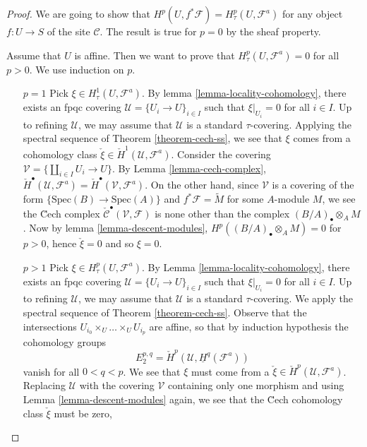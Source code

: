 \begin{proof}
We are going to show that
$H^p(U, f^*\mathcal{F}) = H^p_\tau(U, \mathcal{F}^a)$
for any object $f : U \to S$ of the site $\mathcal{C}$.
The result is true for $p = 0$ by the sheaf property.

\medskip\noindent
Assume that $U$ is affine. Then we want to prove that
$H^p_\tau(U, \mathcal{F}^a) = 0$ for all $p > 0$. We use induction on $p$.
\begin{enumerate}
\item[$p = 1$]
Pick $\xi \in H^1_\tau(U, \mathcal{F}^a)$.
By lemma \ref{lemma-locality-cohomology},
there exists an fpqc covering $\mathcal{U} = \{U_i \to U\}_{i \in I}$
such that $\xi|_{U_i} = 0$ for all $i \in I$. Up to refining
$\mathcal{U}$, we may assume that $\mathcal{U}$ is a standard
$\tau$-covering. Applying the spectral sequence of
Theorem \ref{theorem-cech-ss},
we see that $\xi$ comes from a cohomology class
$\check{\xi} \in \check H^1(\mathcal{U}, \mathcal{F}^a)$.
Consider the covering $\mathcal{V} = \{\coprod_{i\in I} U_i \to U\}$. By
Lemma \ref{lemma-cech-complex},
$\check H^\bullet(\mathcal{U}, \mathcal{F}^a) =
\check H^\bullet(\mathcal{V}, \mathcal{F}^a)$.
On the other hand, since $\mathcal{V}$ is a covering of the form
$\{\text{Spec}(B) \to \text{Spec}(A)\}$ and $f^*\mathcal{F} = \widetilde{M}$
for some $A$-module $M$, we see the \u Cech complex
$\check{\mathcal{C}}^\bullet(\mathcal{V}, \mathcal{F})$
is none other than the complex $(B/A)_\bullet \otimes_A M$.
Now by lemma \ref{lemma-descent-modules},
$H^p((B/A)_\bullet \otimes_A M) = 0$ for $p>0$, hence $\check{\xi} = 0$ and so
$\xi = 0$.
\item[$p > 1$]
Pick $\xi \in H^p_\tau(U, \mathcal{F}^a)$. By
Lemma \ref{lemma-locality-cohomology},
there exists an fpqc covering $\mathcal{U} = \{U_i \to U\}_{i \in I}$
such that $\xi|_{U_i} = 0$ for all $i \in I$. Up to refining
$\mathcal{U}$, we may assume that $\mathcal{U}$ is a standard
$\tau$-covering. We apply the spectral sequence of
Theorem \ref{theorem-cech-ss}.
Observe that the intersections $U_{i_0} \times_U \ldots \times_U U_{i_p}$
are affine, so that by induction hypothesis the cohomology groups
$$
E_2^{p,q} = \check H^p(\mathcal{U}, \underline{H}^q(\mathcal{F}^a))
$$
vanish for all $0 < q < p$. We see that $\xi$ must come from a
$\check{\xi} \in \check H^p(\mathcal{U}, \mathcal{F}^a)$. Replacing
$\mathcal{U}$ with the covering $\mathcal{V}$ containing only one morphism
and using Lemma \ref{lemma-descent-modules} again,
we see that the \u Cech cohomology class $\check{\xi}$ must be zero,

\end{enumerate}
\end{proof}
